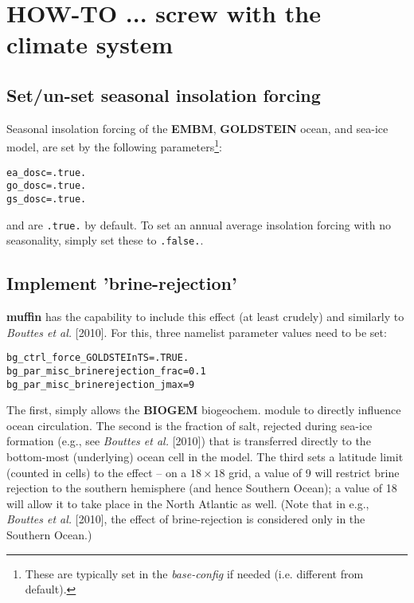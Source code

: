 \documentclass[11pt,fleqn]{book} %
\begin{document}

\newpage


\section{HOW-TO ... screw with the climate system}
\vspace{2mm}

%
\subsection*{Set/un-set seasonal insolation forcing}

\vspace{1mm}
Seasonal insolation forcing of the \textbf{EMBM}, \textbf{GOLDSTEIN} ocean, and sea-ice model, are set by the following parameters\footnote{These are typically set in the \textit{base-config} if needed (i.e. different from default).}:
\vspace{-1mm}\begin{verbatim}
ea_dosc=.true.
go_dosc=.true.
gs_dosc=.true.
\end{verbatim}\vspace{-1mm}
and are \texttt{.true.} by default.
To set an annual average insolation forcing with no seasonality, simply set these to \texttt{.false.}.

%
\subsection*{Implement 'brine-rejection'}

\textbf{muffin} has the capability to include this effect (at least crudely) and similarly to \textit{Bouttes et al.} [2010]. For this, three namelist parameter values need to be set:

\vspace{-2mm}\begin{verbatim}
bg_ctrl_force_GOLDSTEInTS=.TRUE.
bg_par_misc_brinerejection_frac=0.1
bg_par_misc_brinerejection_jmax=9
\end{verbatim}\vspace{-2mm}
The first, simply allows the \textbf{BIOGEM} biogeochem. module to directly influence ocean circulation. The second is the fraction of salt, rejected during sea-ice formation (e.g., see \textit{Bouttes et al.} [2010]) that is transferred directly to the bottom-most (underlying) ocean cell in the model. The third sets a latitude limit (counted in cells) to the effect -- on a \(18\times18\) grid, a value of 9 will restrict brine rejection to the southern hemisphere (and hence Southern Ocean); a value of 18 will allow it to take  place in the North Atlantic as well. (Note that in e.g., \textit{Bouttes et al.} [2010], the effect of brine-rejection is considered only in the Southern Ocean.)
\end{document}
